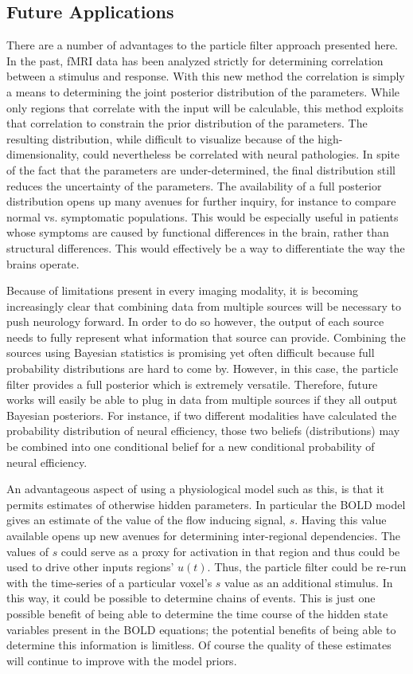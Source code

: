 \subsection{Future Applications}
There are a number of advantages to the particle filter approach presented
here. In the past, \ac{fMRI} data has been analyzed strictly for determining
correlation between a stimulus and response. With this new method
the correlation is simply a means to determining the joint posterior distribution
of the parameters. While only regions that correlate with the input will
be calculable, this method exploits that correlation to constrain the
prior distribution of the parameters. The resulting distribution, while difficult
to visualize because of the high-dimensionality, could nevertheless be
correlated with neural pathologies. In spite of the fact that the parameters
are under-determined, the final distribution still reduces the
uncertainty of the parameters. The availability of a full posterior distribution
opens up many avenues for further inquiry, for instance
to compare normal vs. symptomatic
populations. This would be especially useful in patients whose symptoms
are caused by functional differences in the brain, rather than structural differences.
This would effectively be
a way to differentiate the way the brains operate.

Because of limitations present in every imaging modality,
it is becoming increasingly clear that combining data from multiple sources
will be necessary to push neurology forward. In order to do so however, the
output of each source needs to fully represent what information that source
can provide. Combining the sources using Bayesian statistics is promising
yet often difficult because full probability distributions are hard to come by.
However, in this case, the particle filter provides a full posterior which
is extremely versatile. Therefore, future works will easily be able to
plug in data from multiple sources if they all output Bayesian posteriors.
For instance, if two different modalities have calculated the probability
distribution of neural efficiency, those two beliefs (distributions) may be 
combined into
one conditional belief for a new conditional probability of neural efficiency.

An advantageous aspect of using a physiological model such as this, is that
it permits estimates of otherwise hidden parameters. In particular the \ac{BOLD}
model gives an estimate of the value of the flow inducing signal, $s$. Having
this value available opens up new avenues for determining inter-regional
dependencies. The values of $s$ could serve as a proxy for activation in
that region and thus could be used to drive other inputs regions' $u(t)$.
Thus, the particle filter could be re-run
with the time-series of a particular voxel's $s$ value as an additional stimulus.
In this way, it could be possible to determine chains of events. This is just
one possible benefit of being able to determine the time course of the hidden
state variables present in the \ac{BOLD} equations; the potential benefits of being
able to determine this information is limitless. Of course the quality of these
estimates will continue to improve with the model priors.


